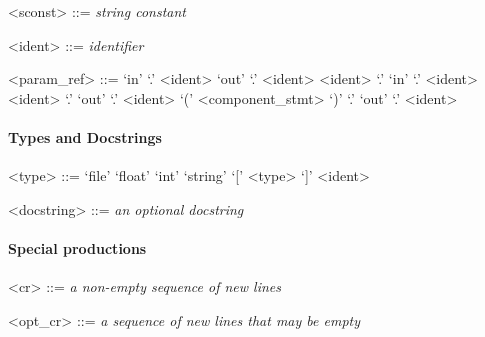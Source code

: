 \begin{grammar}
  <sconst> ::= \emph{string constant}
\end{grammar}

\vs

\begin{grammar}
  <ident> ::= \emph{identifier}
\end{grammar}

\vs

\begin{grammar}
  <param_ref> ::= `in' `.' <ident>
  \alt `out' `.' <ident>
  \alt <ident> `.' `in' `.' <ident>
  \alt <ident> `.' `out' `.' <ident>
  \alt `(' <component_stmt> `)' `.' `out' `.' <ident>
\end{grammar}


\paragraph{Types and Docstrings}

\begin{grammar}
  <type> ::= `file'
  \alt `float'
  \alt `int'
  \alt `string'
  \alt `[' <type> `]'
  \alt <ident>
\end{grammar}

\vs

\begin{grammar}
  <docstring> ::= \emph{an optional docstring}
\end{grammar}


\paragraph{Special productions}

\begin{grammar}
  <cr> ::= \emph{a non-empty sequence of new lines}
\end{grammar}

\vs

\begin{grammar}
  <opt_cr> ::= \emph{a sequence of new lines that may be empty}
\end{grammar}

\vs

\begin{grammar}
  <lbrace> ::= `{' <opt_cr>
\end{grammar}

